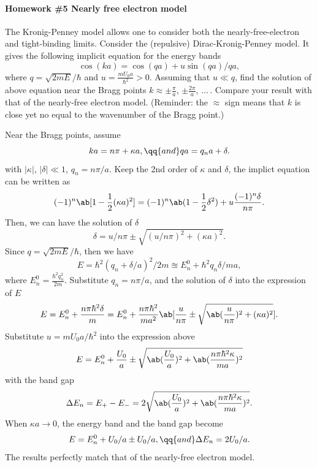 
\paragraph{Homework \#5 Nearly free electron model}

\begin{problem}
  The Kronig-Penney model allows one to consider both the nearly-free-electron
  and tight-binding limits. Consider the (repulsive) Dirac-Kronig-Penney model.
  It gives the following implicit equation for the energy bands
  \[
    \cos(ka) = \cos(qa) + u\sin(qa)/qa,
  \]
  where $q = \sqrt{2mE}/\hbar$ and $u = \frac{mU_0a}{\hbar^2} > 0$. Assuming
  that $u \ll q$, find the solution of above equation near the Bragg points
  $k \approx \pm\frac\pi a$, $\pm\frac{2\pi}{a}$, $\ldots\,$. Compare your
  result with that of the nearly-free electron model. (Reminder: the $\approx$
  sign means that $k$ is close yet no equal to the wavenumber of the Bragg
  point.)
\end{problem}
\begin{solution}
  Near the Bragg points, assume
  \[
    ka = n\pi + \kappa a, \qq{and}
    qa = q_n a + \delta.
  \]
  with $|\kappa|$, $|\delta| \ll 1$, $q_n = n\pi/a$.
  Keep the 2nd order of $\kappa$ and $\delta$, the implict equation can be
  written as
  \[
    (-1)^n \ab[1 - \frac12(\kappa a)^2] = (-1)^n \ab(1 - \frac12\delta^2)
                                        + u\frac{(-1)^n\delta}{n\pi}.
  \]
  Then, we can have the solution of $\delta$
  \[
    \delta = u/n\pi \pm \sqrt{(u/n\pi)^2 + (\kappa a)^2}.
  \]
  Since $q = \sqrt{2mE}/\hbar$, then we have
  \[
    E = \hbar^2(q_n + \delta/a)^2/2m
      \approxeq E_n^0 + \hbar^2 q_n \delta/ma,
  \]
  where $E_n^0 = \frac{\hbar^2q_n^2}{2m}$.
  Substitute $q_n = n\pi/a$, and the solution of $\delta$ into the expression
  of $E$
  \[
    E = E_n^0 + \frac{n\pi\hbar^2\delta}{m}
  = E_n^0 + \frac{n\pi\hbar^2}{ma^2}
            \ab[\frac{u}{n\pi} \pm
            \sqrt{\ab(\frac{u}{n\pi})^2 + (\kappa a)^2}].
  \]
  Substitute $u = mU_0a/\hbar^2$ into the expression above
  \[
    E = E_n^0 + \frac{U_0}{a} \pm
        \sqrt{\ab(\frac{U_0}{a})^2 + \ab(\frac{n\pi\hbar^2\kappa}{ma})^2}
  \]
  with the band gap
  \[
    \Delta E_n = E_+ - E_-
  = 2\sqrt{\ab(\frac{U_0}{a})^2 + \ab(\frac{n\pi\hbar^2\kappa}{ma})^2}.
  \]
  When $\kappa a \to 0$, the energy band and the band gap become
  \[
    E = E_n^0 + U_0/a \pm U_0/a, \qq{and} \Delta E_n = 2U_0/a.
  \]
  The results perfectly match that of the nearly-free electron model.
\end{solution}

